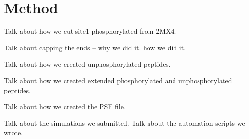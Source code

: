 \section{Method} %
\label{sec:method}

Talk about how we cut site1 phosphorylated from 2MX4.

Talk about capping the ends -- why we did it. how we did it.

Talk about how we created unphosphorylated peptides.

Talk about how we created extended phosphorylated and unphosphorylated peptides.

Talk about how we created the PSF file.

Talk about the simulations we submitted. Talk about the automation scripts we wrote.

